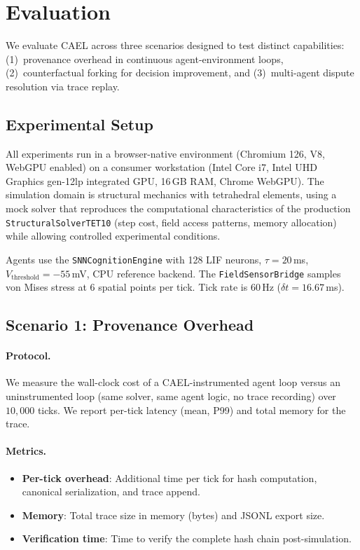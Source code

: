 \documentclass[sigconf,nonacm]{acmart}
\begin{document}
\section{Evaluation}
\label{sec:evaluation}

We evaluate CAEL across three scenarios designed to test distinct
capabilities: (1)~provenance overhead in continuous agent-environment
loops, (2)~counterfactual forking for decision improvement, and
(3)~multi-agent dispute resolution via trace replay.

\subsection{Experimental Setup}

All experiments run in a browser-native environment (Chromium 126,
V8, WebGPU enabled) on a consumer workstation
(Intel Core i7, Intel UHD Graphics gen-12lp integrated GPU, 16\,GB RAM, Chrome WebGPU). The simulation domain is structural
mechanics with tetrahedral elements, using a mock solver that
reproduces the computational characteristics of the production
\texttt{StructuralSolverTET10} (step cost, field access patterns,
memory allocation) while allowing controlled experimental conditions.

Agents use the \texttt{SNNCognitionEngine} with 128 LIF neurons,
$\tau = 20$\,ms, $V_{\text{threshold}} = -55$\,mV, CPU reference
backend. The \texttt{FieldSensorBridge} samples von Mises stress
at 6 spatial points per tick. Tick rate is 60\,Hz ($\delta t = 16.67$\,ms).

\subsection{Scenario 1: Provenance Overhead}

\paragraph{Protocol.}
We measure the wall-clock cost of a CAEL-instrumented agent loop
versus an uninstrumented loop (same solver, same agent logic,
no trace recording) over $10{,}000$ ticks. We report per-tick
latency (mean, P99) and total memory for the trace.

\paragraph{Metrics.}
\begin{itemize}
  \item \textbf{Per-tick overhead}: Additional time per tick for
    hash computation, canonical serialization, and trace append.
  \item \textbf{Memory}: Total trace size in memory (bytes) and
    JSONL export size.
  \item \textbf{Verification time}: Time to verify the complete
    hash chain post-simulation.
\end{itemize}
\end{document}
